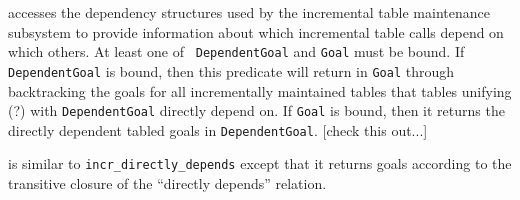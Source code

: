 \begin{description}
accesses the dependency structures used by the incremental table
maintenance subsystem to provide information about which incremental
table calls depend on which others.  At least one of {\tt
DependentGoal} and {\tt Goal} must be bound.  If {\tt DependentGoal}
is bound, then this predicate will return in {\tt Goal} through
backtracking the goals for all incrementally maintained tables that
tables unifying (?) with {\tt DependentGoal} directly depend on.  If
{\tt Goal} is bound, then it returns the directly dependent tabled
goals in {\tt DependentGoal}.  [check this out...]

is similar to {\tt incr\_directly\_depends} except that it returns
goals according to the transitive closure of the ``directly depends''
relation.
\end{description}
